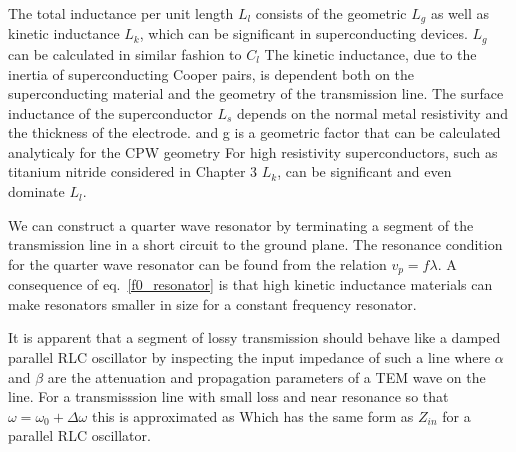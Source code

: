 The total inductance per unit length $L_l$ consists of the geometric $L_g$ as well as kinetic inductance $L_k$,
which can be significant in superconducting devices.
$L_g$ can be calculated in similar fashion to $C_l$ \cite{GaoThesis}
The kinetic inductance, due to the inertia of superconducting Cooper pairs, is dependent both on the superconducting material and the geometry of the transmission line.
The surface inductance of the superconductor $L_s$ depends on the normal metal resistivity and the thickness of the electrode. \cite{KherThesis}
and g is a geometric factor that can be calculated analyticaly for the CPW geometry \cite{GaoThesis}
For high resistivity superconductors, such as titanium nitride considered in Chapter 3 $L_k$, can be significant and even dominate $L_l$.

We can construct a quarter wave resonator by terminating a segment of the transmission line in a short circuit to the ground plane.
The resonance condition for the quarter wave resonator can be found from the relation $v_p = f \lambda$.
A consequence of eq.~\ref{f0_resonator} is that high kinetic inductance materials can make resonators smaller in size for a constant frequency resonator.

It is apparent that a segment of lossy transmission should behave like a damped parallel RLC oscillator by inspecting the input impedance of such a line \cite{Pozar}
where $\alpha$ and $\beta$ are the attenuation and propagation parameters of a TEM wave on the line.
For a transmisssion line with small loss and near resonance so that $\omega = \omega_0 + \Delta \omega$ this is approximated as
Which has the same form as $Z_{in}$ for a parallel RLC oscillator.

